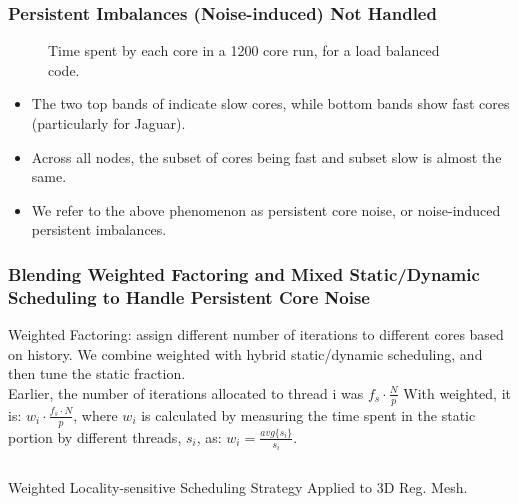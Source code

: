 \begin{frame}
  \frametitle{Persistent Imbalances (Noise-induced) Not Handled} 
  \begin{figure}
    \caption{\small Time spent by each core in a 1200 core run, for a load balanced code.}
  \end{figure}
  \begin{itemize}
    \tiny \item \tiny The two top bands of indicate slow cores, while
    bottom bands show fast cores (particularly for Jaguar).
  \item \tiny Across all nodes, the subset of cores being fast and
    subset slow is almost the same. 
  \item \tiny We refer to the above phenomenon as persistent core noise,
    or  noise-induced persistent imbalances. 
  \end{itemize}
\end{frame}

\begin{frame}
\frametitle{Blending Weighted Factoring and Mixed Static/Dynamic Scheduling to Handle Persistent Core Noise}
{\small Weighted Factoring: assign different number of iterations to different cores based on history.}
{\small We combine weighted with hybrid static/dynamic scheduling, and
  then tune the static fraction.}\\
{\small Earlier, the number of iterations allocated to thread i was
 $f_s \cdot \frac{N}{p}$}
{\small With weighted, it is: $w_i \cdot \frac{f_s \cdot N}{p}$,
where $w_i$ is calculated by measuring the time spent in the static
portion by different threads, $s_i$, as: $w_i = \frac{avg\{s_i\}}{s_i}$}.
\begin{columns}
         {\small Weighted Locality-sensitive Scheduling Strategy Applied to 3D Reg. Mesh.\\}
         \begin{center}
           \\
         \end{center}
\end{columns}
\end{frame}

